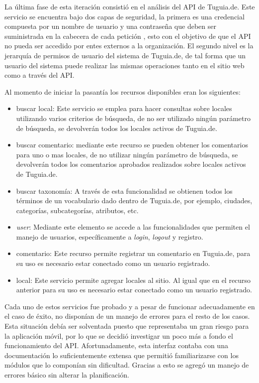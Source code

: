 La última fase de esta iteración consistió en el análisis del API de Tuguia.de. Este servicio se encuentra bajo dos capas de seguridad, la primera es una credencial compuesta por un nombre de usuario y una contraseña que deben ser suministrada en la cabecera de cada petición , esto con el objetivo de que el API no pueda ser accedido  por entes externos a la organización. El segundo nivel es la jerarquía de permisos de usuario del sistema de Tuguia.de, de tal forma que un usuario del sistema puede realizar las mismas operaciones tanto en el sitio web como a través del API. 

Al momento de iniciar la pasantía los recursos disponibles eran los siguientes:
\begin{itemize}
\item buscar local: Este servicio se emplea para hacer consultas sobre locales utilizando varios criterios de búsqueda, de no ser utilizado ningún parámetro de búsqueda, se devolverán todos los locales activos de Tuguia.de.
\item buscar comentario: mediante este recurso se pueden obtener los comentarios para uno o mas locales, de no utilizar ningún parámetro de búsqueda, se devolverán todos los comentarios aprobados realizados sobre locales activos de Tuguia.de.
\item buscar taxonomía: A través de esta funcionalidad se obtienen todos los términos de un vocabulario dado dentro de Tuguia.de, por ejemplo, ciudades, categorías, subcategorías, atributos, etc.
\item \textit{user}: Mediante este elemento se accede a las funcionalidades que permiten el manejo de usuarios, específicamente a \textit{login}, \textit{logout} y registro.
\item comentario: Este recurso permite registrar un comentario en Tuguia.de, para su uso es necesario estar conectado como un usuario registrado.
\item local: Este servicio permite agregar locales al sitio. Al igual que en el recurso anterior para su uso es necesario estar conectado como un usuario registrado.
\end{itemize}

Cada uno de estos servicios fue probado y a pesar de funcionar adecuadamente en el caso de éxito, no disponían de un manejo de errores para el resto de los casos. Esta situación debía ser solventada puesto que representaba un gran riesgo para la aplicación móvil, por lo que se decidió investigar un poco más a fondo el funcionamiento del API. Afortunadamente, esta interfaz contaba con una documentación lo suficientemente extensa que permitió familiarizarse con los módulos que lo componían sin dificultad. Gracias a esto se agregó un manejo de errores básico sin alterar la planificación.

